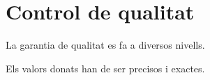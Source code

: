 \section{Control de qualitat}
\label{sec:control-de-qualitat}

La garantia de qualitat es fa a diversos nivells.

Els valors donats han de ser precisos i exactes.

